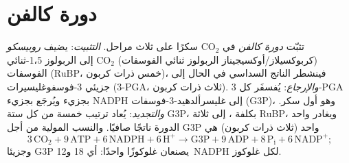 \section{دورة كالفن}

\begin{definition}\label{def:b1:photosynthesis:fixation}
تثبّت \emph{دورة كالفن} في  $\mathrm{CO_2}$ سكرًا على ثلاث
مراحل. \emph{التثبيت}: يضيف \emph{روبيسكو} (كربوكسيلاز/أوكسيجيناز
الربولوز ثنائي الفوسفات) $\mathrm{CO_2}$ إلى الربولوز 1،5-ثنائي
الفوسفات (RuBP، خمس ذرات كربون)، فينشطر الناتج السداسي في الحال إلى
جزيئي 3-فوسفوغليسيرات (3-PGA، ثلاث ذرات كربون).
\emph{والإرجاع}: يُفسفَر كل 3-PGA بجزيء  ويُرجَع بجزيء NADPH إلى
غليسرألدهيد-3-فوسفات (G3P)، وهو أول سكر. \emph{والتجديد}: يُعاد ترتيب
خمسة من كل ستة G3P، بكلفة ، إلى ثلاثة RuBP، ويغادر واحد الدورة
ناتجًا صافيًا. والنسب المولية من أجل G3P واحد (ثلاث ذرات كربون) هي
\[
3\,\mathrm{CO_2} + 9\,\mathrm{ATP} + 6\,\mathrm{NADPH} + 6\,\mathrm{H^+}
\to \text{G3P} + 9\,\mathrm{ADP} + 8\,\mathrm{P_i} + 6\,\mathrm{NADP^+} ;
\]
وجزيئا G3P يصنعان غلوكوزًا واحدًا: أي \qty{18}{}  و\qty{12}{NADPH} لكل غلوكوز.
\end{definition}

